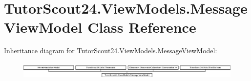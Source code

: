 \hypertarget{class_tutor_scout24_1_1_view_models_1_1_message_view_model}{}\section{Tutor\+Scout24.\+View\+Models.\+Message\+View\+Model Class Reference}
\label{class_tutor_scout24_1_1_view_models_1_1_message_view_model}
Inheritance diagram for Tutor\+Scout24.\+View\+Models.\+Message\+View\+Model\+:\begin{figure}[H]
\begin{center}
\leavevmode
\includegraphics[height=0.883281cm]{class_tutor_scout24_1_1_view_models_1_1_message_view_model}
\end{center}
\end{figure}
